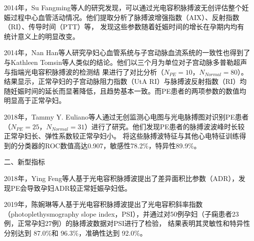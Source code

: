 2014年，Su Fangming等人\cite{Su2014}的研究发现，可以通过光电容积脉搏波无创评估整个妊娠过程中心血管活动情况。他们提取分析了脉搏波增强指数（AIX）、反射指数（RI）、传导时间（PTT）等，
发现这些参数随着妊娠时间的增长在孕期内均有统计意义上的明显改变。

2014年，Nan Han等人\cite{Han2014}研究孕妇心血管系统与子宫动脉血流系统的一致性也得到了与Kathleen Tomsin等人\cite{Tomsin2012}类似的结论。他们以三个月为单位对子宫动脉多普勒超声与指端光电容积脉搏波的检测结
果进行了对比分析（$N_{PE}=10$，$N_{Normal}=80$）。结果显示，正常孕妇的子宫动脉阻力指数（UtA RI）与脉搏波反射指数（RI）均随妊娠时间的延长而显著降低，且趋势基本一致。而PE患者的两项参数的数值均明显高于正常孕妇。

2018年，Tammy Y. Euliano等人\cite{Euliano2018}通过无创监测心电图与光电脉搏图对识别PE患者（$N_{PE}=25$，$N_{Normal}=31$）进行了研究。他们发现PE患者的脉搏波波峰时长较正常孕妇长、弹性系数较正常孕妇小。
将这些脉搏波特征与其他心电特征训练得到的分类器的ROC数值高达0.907，敏感性78.2\%，特异性89.9\%。

二、新型指标

2018年，Ying Feng等人\cite{Feng2018}基于光电容积脉搏波提出了差异面积比参数（ADR），发现PE会导致孕妇ADR较正常妊娠孕妇低。

2019年，陈婉琳等人\cite{Chen2019}基于光电容积脉搏波提出了光电容积斜率指数（photoplethysmography slope index，PSI），并通过对50例孕妇（子痫患者23例，正常孕妇27例）的脉搏波数据对PSI进行了检验，
结果表明其灵敏性和特异性分别达到 87.0\%和 96.3\%，准确性达到 92.0\%。

